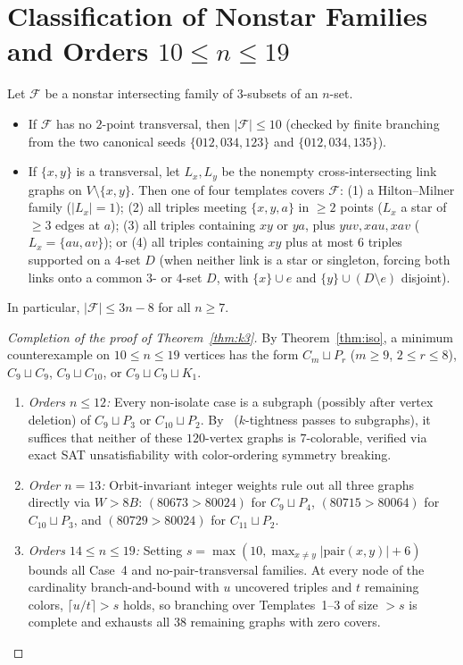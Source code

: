 \documentclass[11pt]{article}
\begin{document}
\section{Classification of Nonstar Families and Orders $10 \le n \le 19$}\label{sec:class}

Let $\mathcal{F}$ be a nonstar intersecting family of $3$-subsets of an $n$-set.
\begin{itemize}
\item If $\mathcal{F}$ has no $2$-point transversal, then $|\mathcal{F}| \le 10$ (checked by finite branching from the two canonical seeds $\{012, 034, 123\}$ and $\{012, 034, 135\}$).
\item If $\{x, y\}$ is a transversal, let $L_x, L_y$ be the nonempty cross-intersecting link graphs on $V \setminus \{x, y\}$. Then one of four templates covers $\mathcal{F}$: (1) a Hilton--Milner family ($|L_x| = 1$); (2) all triples meeting $\{x, y, a\}$ in $\ge 2$ points ($L_x$ a star of $\ge 3$ edges at $a$); (3) all triples containing $xy$ or $ya$, plus $yuv, xau, xav$ ($L_x = \{au, av\}$); or (4) all triples containing $xy$ plus at most $6$ triples supported on a $4$-set $D$ (when neither link is a star or singleton, forcing both links onto a common $3$- or $4$-set $D$, with $\{x\} \cup e$ and $\{y\} \cup (D \setminus e)$ disjoint).
\end{itemize}
In particular, $|\mathcal{F}| \le 3n - 8$ for all $n \ge 7$.

\begin{proof}[Completion of the proof of Theorem~\ref{thm:k3}]
By Theorem~\ref{thm:iso}, a minimum counterexample on $10 \le n \le 19$ vertices has the form $C_m \sqcup P_r$ ($m \ge 9$, $2 \le r \le 8$), $C_9 \sqcup C_9$, $C_9 \sqcup C_{10}$, or $C_9 \sqcup C_9 \sqcup K_1$.
\begin{enumerate}
\item \emph{Orders $n \le 12$:} Every non-isolate case is a subgraph (possibly after vertex deletion) of $C_9 \sqcup P_3$ or $C_{10} \sqcup P_2$. By~\cite[Corollary~2.2]{AHKS2026} ($k$-tightness passes to subgraphs), it suffices that neither of these $120$-vertex graphs is $7$-colorable, verified via exact SAT unsatisfiability with color-ordering symmetry breaking.
\item \emph{Order $n = 13$:} Orbit-invariant integer weights rule out all three graphs directly via $W > 8B$: $(80673 > 80024)$ for $C_9 \sqcup P_4$, $(80715 > 80064)$ for $C_{10} \sqcup P_3$, and $(80729 > 80024)$ for $C_{11} \sqcup P_2$.
\item \emph{Orders $14 \le n \le 19$:} Setting $s = \max(10, \max_{x \ne y} |\mathrm{pair}(x, y)| + 6)$ bounds all Case~4 and no-pair-transversal families. At every node of the cardinality branch-and-bound with $u$ uncovered triples and $t$ remaining colors, $\lceil u/t \rceil > s$ holds, so branching over Templates~1--3 of size $> s$ is complete and exhausts all $38$ remaining graphs with zero covers. \qedhere
\end{enumerate}
\end{proof}
\end{document}
